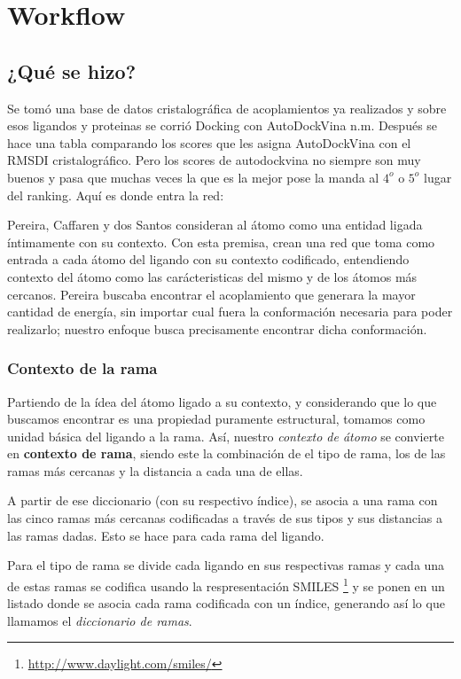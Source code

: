 \section{Workflow}
\subsection{¿Qué se hizo?}
Se tomó una base de datos cristalográfica de acoplamientos ya
realizados y sobre esos ligandos y proteinas se corrió Docking con
AutoDockVina n.m. Después se hace una tabla comparando los scores que
les asigna AutoDockVina con el RMSDI cristalográfico. Pero los scores
de autodockvina no siempre son muy buenos y pasa que muchas veces la
que es la mejor pose la manda al $4^o$ o $5^o$ lugar del ranking.
Aquí es donde entra la red:

Pereira, Caffaren y dos Santos \cite{dossantos} consideran al átomo
como una entidad ligada íntimamente con su contexto. Con esta premisa,
crean una red que toma como entrada a cada átomo del ligando con su
contexto codificado, entendiendo contexto del átomo como las
carácteristicas del mismo y de los átomos más cercanos.
Pereira buscaba encontrar el acoplamiento que generara la mayor
cantidad de energía, sin importar cual fuera la conformación necesaria
para poder realizarlo; nuestro enfoque busca precisamente encontrar
dicha conformación.

\subsubsection{Contexto de la rama}
Partiendo de la ídea del átomo ligado a su contexto, y considerando
que lo que buscamos encontrar es una propiedad puramente estructural,
tomamos como unidad básica del ligando a la rama. Así, nuestro
\textit{contexto de átomo} se convierte en \textbf{contexto de rama},
siendo este la combinación de el tipo de rama, los de las ramas más
cercanas y la distancia a cada una de ellas.

A partir de ese diccionario (con su respectivo índice), se asocia a
una rama con las cinco ramas más cercanas codificadas a través de sus
tipos y sus distancias a las ramas dadas. Esto se hace para cada rama
del ligando.

Para el tipo de rama se divide cada ligando en sus respectivas ramas y
cada una de estas ramas se codifica usando la respresentación
SMILES \footnote{\url{http://www.daylight.com/smiles/}} y se ponen en
un listado donde se asocia cada rama codificada con un índice,
generando así lo que llamamos el \textit{diccionario de ramas}.

